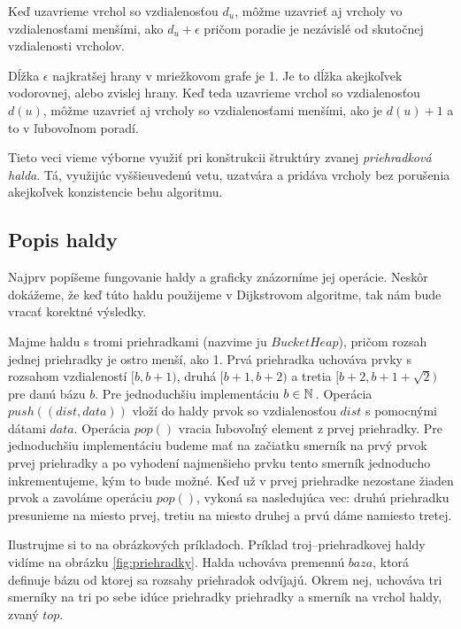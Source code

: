 \begin{consequence}
Keď uzavrieme vrchol so vzdialenosťou $d_u$, môžme uzavrieť aj vrcholy vo vzdialenosťami menšími, ako $d_u + \epsilon$
pričom poradie je nezávislé od skutočnej vzdialenosti vrcholov.
\end{consequence}

\begin{example}
\label{ex:range}
Dĺžka $\epsilon$ najkratšej hrany v mriežkovom grafe je 1. Je to dĺžka akejkoľvek vodorovnej, alebo zvislej hrany.
Keď teda uzavrieme vrchol so vzdialenosťou $d(u)$, môžme uzavrieť aj vrcholy so vzdialenosťami menšími, ako je $d(u) + 1$ a to v ľubovoľnom poradí.
\end{example}

Tieto veci vieme výborne využiť pri konštrukcii štruktúry
zvanej {\sl priehradková halda}. Tá, využijúc vyššieuvedenú vetu, uzatvára a pridáva vrcholy bez porušenia akejkoľvek konzistencie behu algoritmu.

\subsection{Popis haldy}
Najprv popíšeme fungovanie haldy a graficky znázorníme jej 
operácie. Neskôr dokážeme, že keď túto haldu použijeme v Dijkstrovom algoritme, tak nám bude vracať korektné výsledky.

Majme haldu s tromi priehradkami (nazvime ju $BucketHeap$), pričom rozsah jednej priehradky je ostro menší, ako 1.
Prvá priehradka uchováva prvky s rozsahom vzdialeností $ [b, b+1) $, druhá $ [b+1, b+2) $ a tretia $ [b+2, b+1+\sqrt{2}) $
pre danú bázu $ b $. Pre jednoduchšiu implementáciu $b \in \mathbb{N}\,$. Operácia $push((dist, data))$ vloží do haldy prvok so vzdialenosťou $dist$ 
s pomocnými dátami $data$. Operácia $pop()$ vracia ľubovoľný element z prvej priehradky. 
Pre jednoduchšiu implementáciu budeme mať na začiatku smerník na prvý prvok prvej priehradky a po vyhodení najmenšieho prvku tento smerník jednoducho inkrementujeme, kým to bude možné. Keď už v prvej priehradke nezostane žiaden prvok a zavoláme operáciu $pop()$, vykoná sa nasledujúca vec: druhú priehradku presunieme na miesto prvej, tretiu na miesto druhej a prvú dáme namiesto tretej.

Ilustrujme si to na obrázkových príkladoch. Príklad troj--priehradkovej haldy vidíme na obrázku \ref{fig:priehradky}.
Halda uchováva premennú $ baza $, ktorá definuje bázu od ktorej sa rozsahy priehradok odvíjajú. Okrem
nej, uchováva tri smerníky na tri po sebe idúce priehradky priehradky a smerník na vrchol haldy, zvaný $ top $.



